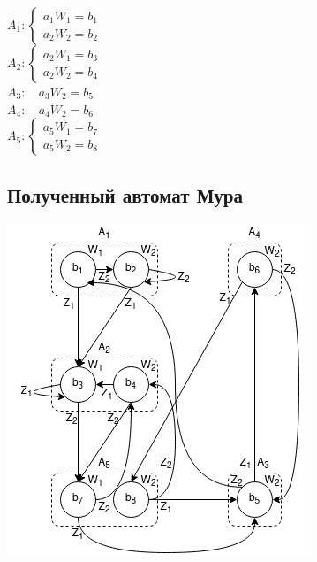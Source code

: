 \documentclass[12pt, a4paper]{article}
\begin{document}
\noindent $A_1 : \begin{cases}
  a_1W_1 = b_1 \\
  a_2W_2 = b_2
\end{cases}$\\
$A_2 : \begin{cases}
  a_2W_1 = b_3 \\
  a_2W_2 = b_4
\end{cases}$\\
$A_3 : \; \; \: \, a_3W_2 = b_5$\\    %
$A_4 : \; \; \: \, a_4W_2 = b_6$\\    %
$A_5 : \begin{cases}
  a_5W_1 = b_7 \\
  a_5W_2 = b_8
\end{cases}$\\

\subsection*{Полученный автомат Мура}

\begin{center}
\includegraphics[scale=0.8]{moore}\\
\end{center}
\end{document}
